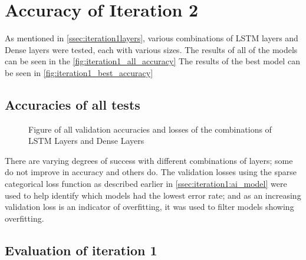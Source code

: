 \section{Accuracy of Iteration 2}
As mentioned in \autoref{ssec:iteration1layers}, various combinations of LSTM layers and Dense layers were tested,
each with various sizes. The results of all of the models can be seen in the \autoref{fig:iteration1_all_accuracy}
The results of the best model can be seen in \autoref{fig:iteration1_best_accuracy}
\subsection{Accuracies of all tests}
\begin{figure}[ht]
    \centering
    \qquad
    
    \caption[Figure of accuracies and losses for Iteration 1]{Figure of all validation accuracies and losses of the combinations of LSTM Layers and Dense Layers}
    \label{fig:iteration1_all_accuracy}
\end{figure}
\FloatBarrier

There are varying degrees of success with different combinations of layers; some do not improve in accuracy and others do.
The validation losses using the sparse categorical loss function as described earlier in \autoref{ssec:iteration1:ai_model}
were used to help identify which models had the lowest error rate; and as an increasing validation
loss is an indicator of overfitting, it was used to filter models showing overfitting.

\subsection{Evaluation of iteration 1}